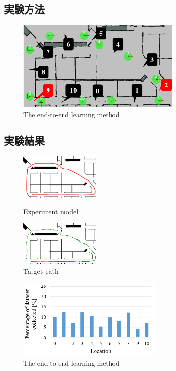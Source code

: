 \documentclass{jarticle}
\begin{document}
\subsection{実験方法}

\begin{figure}[h!]
  \centering
   \includegraphics[height=45mm]{./png/location.png}
   \caption{The end-to-end learning method}
\end{figure}


\subsection{実験結果}

\begin{figure}[htbp]
  \begin{minipage}{0.45\hsize}
   \centering
   \includegraphics[width=40mm]{./png/failed.png}
   \caption{Experiment model}
  \end{minipage}
  \begin{minipage}{0.5\hsize}
   \centering
   \includegraphics[width=40mm]{./png/analy.png}
   \caption{Target path}
  \end{minipage}
\end{figure}

\begin{figure}[h!]
  \centering
   \includegraphics[height=40mm]{./png/set.png}
   \caption{The end-to-end learning method}
\end{figure}
\end{document}
